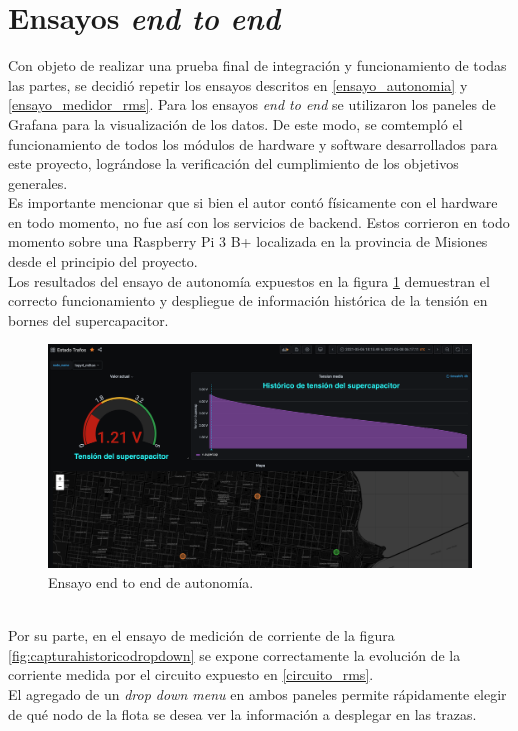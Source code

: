 \section{Ensayos \textit{end to end}}
Con objeto de realizar una prueba final de integraci\'{o}n y funcionamiento de todas las partes, se decidi\'{o} repetir los ensayos descritos en \ref{ensayo_autonomia} y \ref{ensayo_medidor_rms}. Para los ensayos \textit{end to end} se utilizaron los paneles de Grafana para la visualización de los datos. De este modo, se comtempló el funcionamiento de todos los módulos de hardware y software desarrollados para este proyecto, lográndose la verificación del cumplimiento de los objetivos generales.\\
Es importante mencionar que si bien el autor cont\'{o} físicamente con el hardware en todo momento, no fue as\'{i} con los servicios de backend. Estos corrieron en todo momento sobre una Raspberry Pi 3 B+ localizada en la provincia de Misiones desde el principio del proyecto.\\
Los resultados del ensayo de autonomía expuestos en la figura \ref{fig:e2esupercap} demuestran el correcto funcionamiento y despliegue de informaci\'{o}n hist\'{o}rica de la tensión en bornes del supercapacitor.\\
\begin{figure}[h]
	\centering
	\includegraphics[width=1.0\linewidth]{Figures/e2e_supercap}
	\caption{Ensayo end to end de autonom\'{i}a.}
	\label{fig:e2esupercap}
\end{figure}\\
Por su parte, en el ensayo de medici\'{o}n de corriente de la figura \ref{fig:capturahistoricodropdown} se expone correctamente la evoluci\'{o}n de la corriente medida por el circuito expuesto en \ref{circuito_rms}.\\
El agregado de un \textit{drop down menu} en ambos paneles permite rápidamente elegir de qu\'{e} nodo de la flota se desea ver la informaci\'{o}n a desplegar en las trazas.\\
